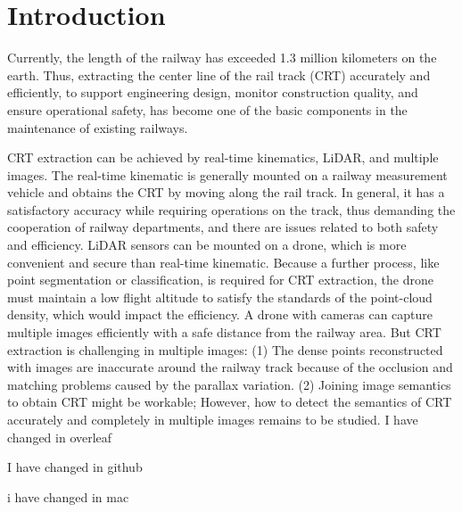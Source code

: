 \section{Introduction}

Currently,
the length of the railway has exceeded 1.3 million kilometers on the earth.
Thus,
extracting the center line of the rail track (CRT) accurately and efficiently, 
to support engineering design, monitor construction quality, 
and ensure operational safety,
has become one of the basic components in the maintenance of existing railways.

CRT extraction can be achieved by real-time kinematics, LiDAR,
and multiple images.
The real-time kinematic is generally mounted on a railway measurement vehicle and obtains the CRT by moving along the rail track.
In general, 
it has a satisfactory accuracy while requiring operations on the track,
thus demanding the cooperation of railway departments, 
and there are issues related to both safety and efficiency.
LiDAR sensors can be mounted on a drone, 
which is more convenient and secure than real-time kinematic. 
Because a further process, 
like point segmentation or classification,
is required for CRT extraction,
the drone must maintain a low flight altitude to satisfy the standards of the point-cloud density,
which would impact the efficiency.
A drone with cameras can capture multiple images efficiently with a safe distance from the railway area.
But CRT extraction is challenging in multiple images:
(1) The dense points reconstructed with images are inaccurate around the railway track because of the occlusion and matching problems caused by the parallax variation.
(2) Joining image semantics to obtain CRT might be workable;
However,
how to detect the semantics of CRT accurately and completely in multiple images remains to be studied.
I have changed in overleaf

I have changed in github

i have changed in mac











